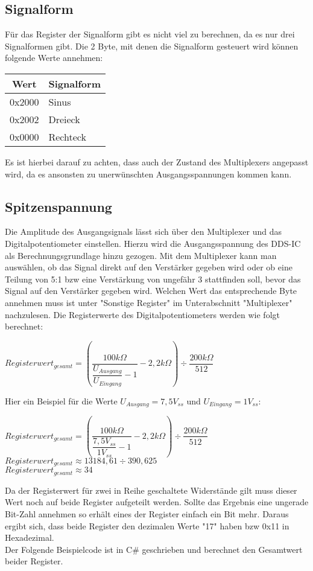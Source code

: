 \documentclass[a4paper,12pt]{article}
\begin{document}
\subsection{Signalform}
Für das Register der Signalform gibt es nicht viel zu berechnen, da es nur drei Signalformen gibt. Die 2 Byte, mit denen die Signalform gesteuert wird können folgende Werte annehmen:
\begin{center}
\begin{tabular}{c||l}
Wert & Signalform \\
\hline
\hline
0x2000 & Sinus \\
\hline
0x2002 & Dreieck \\
\hline
0x0000 & Rechteck \\
\end{tabular}
\end{center}
Es ist hierbei darauf zu achten, dass auch der Zustand des Multiplexers angepasst wird, da es ansonsten zu unerwünschten Ausgangsspannungen kommen kann.

\subsection{Spitzenspannung}
Die Amplitude des Ausgangsignals lässt sich über den Multiplexer und das Digitalpotentiometer einstellen. Hierzu wird die Ausgangsspannung des DDS-IC als Berechnungsgrundlage hinzu gezogen. Mit dem Multiplexer kann man auswählen, ob das Signal direkt auf den Verstärker gegeben wird oder ob eine Teilung von 5:1 bzw eine Verstärkung von ungefähr 3 stattfinden soll, bevor das Signal auf den Verstärker gegeben wird. Welchen Wert das entsprechende Byte annehmen muss ist unter "Sonstige Register" im Unterabschnitt "Multiplexer" nachzulesen. Die Registerwerte des Digitalpotentiometers werden wie folgt berechnet:\\

\begin{center}
$Registerwert_{gesamt} = (\dfrac{100k\Omega}{\dfrac{U_{Ausgang}}{U_{Eingang}}-1}-2,2k\Omega)\div \dfrac{200k\Omega}{512}$
\end{center}

Hier ein Beispiel für die Werte $U_{Ausgang}=7,5V_{ss}$ und $U_{Eingang}=1V_{ss}$:\\

\begin{center}
$Registerwert_{gesamt} = (\dfrac{100k\Omega}{\dfrac{7,5V_{ss}}{1V_{ss}}-1}-2,2k\Omega)\div \dfrac{200k\Omega}{512}$\\
\medskip
$Registerwert_{gesamt} \approx 13184,61\div 390,625$ \\
\medskip
$Registerwert_{gesamt} \approx 34$
\end{center}
Da der Registerwert für zwei in Reihe geschaltete Widerstände gilt muss dieser Wert noch auf beide Register aufgeteilt werden. Sollte das Ergebnis eine ungerade Bit-Zahl annehmen so erhält eines der Register einfach ein Bit mehr. Daraus ergibt sich, dass beide Register den dezimalen Werte "17" haben bzw 0x11 in Hexadezimal.\\
Der Folgende Beispielcode ist in C\# geschrieben und berechnet den Gesamtwert beider Register.
\end{document}

